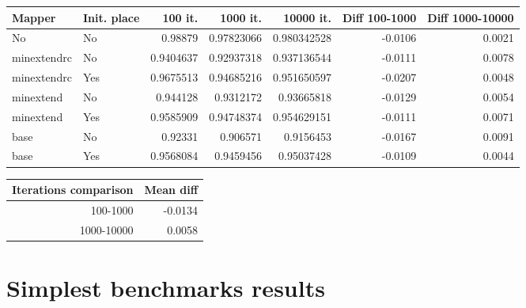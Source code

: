 \documentclass[11pt]{article}
\begin{document}
\begin{center}
\label{tab:org67d7329}
\begin{tabular}{llrrrrr}
\hline
Mapper & Init. place & 100 it. & 1000 it. & 10000 it. & Diff 100-1000 & Diff 1000-10000\\
\hline
No & No & 0.98879 & 0.97823066 & 0.980342528 & -0.0106 & 0.0021\\
\hline
minextendrc & No & 0.9404637 & 0.92937318 & 0.937136544 & -0.0111 & 0.0078\\
minextendrc & Yes & 0.9675513 & 0.94685216 & 0.951650597 & -0.0207 & 0.0048\\
minextend & No & 0.944128 & 0.9312172 & 0.93665818 & -0.0129 & 0.0054\\
minextend & Yes & 0.9585909 & 0.94748374 & 0.954629151 & -0.0111 & 0.0071\\
base & No & 0.92331 & 0.906571 & 0.9156453 & -0.0167 & 0.0091\\
base & Yes & 0.9568084 & 0.9459456 & 0.95037428 & -0.0109 & 0.0044\\
\hline
\end{tabular}
\end{center}

\begin{center}
\begin{tabular}{rr}
\hline
Iterations comparison & Mean diff\\
\hline
100-1000 & -0.0134\\
1000-10000 & 0.0058\\
\hline
\end{tabular}
\end{center}






\section{Simplest benchmarks results}
\label{sec:org1303eda}
\end{document}
